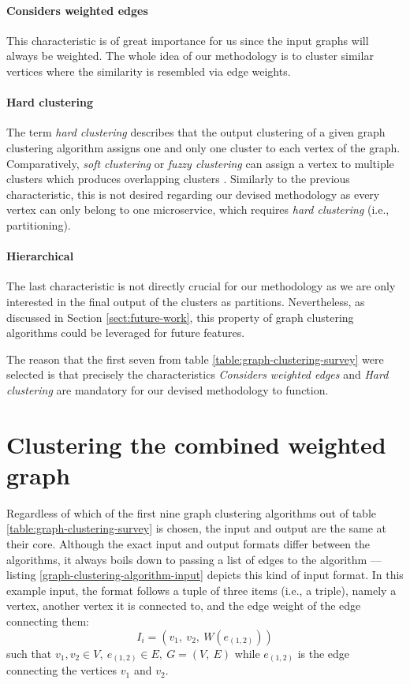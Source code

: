 \documentclass[12pt,a4paper]{report}
\begin{document}
\paragraph{Considers weighted edges}
This characteristic is of great importance
for us since the input graphs will always be weighted. The whole
idea of our methodology is to cluster similar vertices where the similarity is
resembled via edge weights.

\paragraph{Hard clustering}
The term \textit{hard clustering} describes that
the output clustering of a given graph clustering algorithm assigns one and
only one cluster to each vertex of the graph. Comparatively, \textit{soft
clustering} or \textit{fuzzy clustering} can assign a vertex to multiple
clusters which produces overlapping clusters \cite{lancichinetti2009community}.
Similarly to the previous characteristic, this is not desired regarding our
devised methodology as every vertex can only belong to one microservice, which
requires \textit{hard clustering} (i.e., partitioning).

\paragraph{Hierarchical}
The last characteristic is not directly crucial for
our methodology as we are only interested in the final output of the clusters
as partitions. Nevertheless, as discussed in Section \ref{sect:future-work},
this property of graph clustering algorithms could be leveraged for future
features. \newline

The reason that the first seven from table \ref{table:graph-clustering-survey}
were selected is that precisely the characteristics \textit{Considers weighted
edges} and \textit{Hard clustering} are mandatory for our devised methodology
to function.



\section{Clustering the combined weighted graph}

Regardless of which of the first nine graph clustering algorithms out of table
\ref{table:graph-clustering-survey} is chosen, the input and output are the
same at their core. Although the exact input and output formats differ between
the algorithms, it always boils down to passing a list of edges to the
algorithm --- listing \ref{graph-clustering-algorithm-input} depicts this kind
of input format. In this example input, the format follows a tuple of three
items (i.e., a triple), namely a vertex, another vertex it is connected to, and
the edge weight of the edge connecting them:
\[
  I_i = (v_1, \ v_2, \ W(e_{(1,2)}))
\]
such that \(v_1, v_2 \in V, \ e_{(1,2)} \in E, \ G = (V, \ E)\) while
\(e_{(1,2)}\) is the edge connecting the vertices \(v_1\) and \(v_2\).
\end{document}
